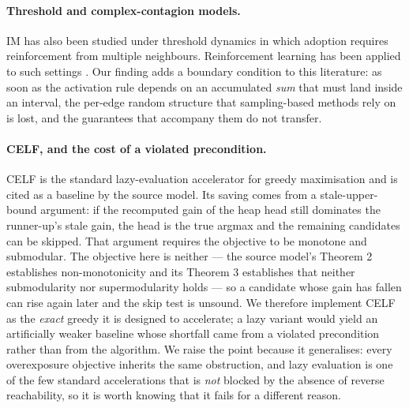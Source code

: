 \paragraph{Threshold and complex-contagion models.}
IM has also been studied under threshold dynamics in which adoption requires reinforcement from
multiple neighbours. Reinforcement learning has been applied to such settings
\cite{chen2023rl4ccim}. Our finding adds a boundary condition to this literature: as soon as the
activation rule depends on an accumulated \emph{sum} that must land inside an interval, the
per-edge random structure that sampling-based methods rely on is lost, and the guarantees that
accompany them do not transfer.

\paragraph{CELF, and the cost of a violated precondition.}
\textsc{CELF} \cite{leskovec2007cost} is the standard lazy-evaluation accelerator for greedy
maximisation and is cited as a baseline by the source model. Its saving comes from a
stale-upper-bound argument: if the recomputed gain of the heap head still dominates the
runner-up's stale gain, the head is the true argmax and the remaining candidates can be skipped.
That argument requires the objective to be monotone and submodular. The objective here is neither
--- the source model's Theorem 2 establishes non-monotonicity and its Theorem 3 establishes that
neither submodularity nor supermodularity holds --- so a candidate whose gain has fallen can rise
again later and the skip test is unsound. We therefore implement \textsc{CELF} as the
\emph{exact} greedy it is designed to accelerate; a lazy variant would yield an artificially
weaker baseline whose shortfall came from a violated precondition rather than from the algorithm.
We raise the point because it generalises: every overexposure objective inherits the same
obstruction, and lazy evaluation is one of the few standard accelerations that is \emph{not}
blocked by the absence of reverse reachability, so it is worth knowing that it fails for a
different reason.
